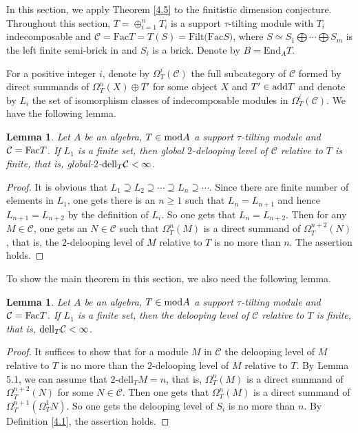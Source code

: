 \documentclass[a4paper]{amsart}
\newtheorem{lem}[thm]{Lemma}
\theoremstyle{definition}
\theoremstyle{remark}
\numberwithin{equation}{section}
\begin{document}
In this section, we apply Theorem \ref{4.5} to the finitistic dimension conjecture. Throughout this section, $T=\oplus_{i=1}^nT_i$ is a support $\tau$-tilting module with $T_i$ indecomposable and $\mathcal{C}=\text{Fac}T=T(S)=\text{Filt(Fac}S)$, where $S\simeq S_1\bigoplus \cdots \bigoplus S_m$ is the left finite semi-brick in \cite[Theorem 2.3(2)]{As}
 and $S_i$ is a brick. Denote by $B=\text{End}_A T$.

For a positive integer $i$, denote by $\Omega^i_T(\mathcal{C})$ the full subcategory of $\mathcal{C}$ formed by direct summands of $\Omega_T^n(X)\oplus T'$ for some object $X$ and $T'\in{\rm add}T$ and denote by $L_i$ the set of isomorphism classes of indecomposable modules in $\Omega^i_T(\mathcal{C})$. We have the following lemma.

\begin{lem}\label{5.1} Let $A$ be an algebra, $T\in {\rm mod}A$ a support $\tau$-tilting module and $\mathcal{C}=\textup{Fac}T$. If $L_1$ is a finite set, then global $2$-delooping level of $\mathcal{C}$ relative to $T$ is finite, that is, global-$2$-$\textup{dell}_T\mathcal{C}<\infty$.
\end{lem}

\begin{proof} It is obvious that $L_1\supseteq L_2\supseteq\cdots\supseteq L_n\supseteq\cdots$. Since there are finite number of elements in $L_1$, one gets there is an $n\geq 1$ such that $L_n=L_{n+1}$ and hence $L_{n+1}=L_{n+2}$ by the definition of $L_i$. So one gets that $L_n=L_{n+2}$. Then for any $M\in \mathcal{C}$, one gets an $N\in \mathcal{C}$ such that $\Omega^n_T(M)$ is a direct summand of $\Omega^{n+2}_T(N)$, that is, the $2$-delooping level of $M$ relative to $T$ is no more than $n$. The assertion holds.
\end{proof}

To show the main theorem in this section, we also need the following lemma.

\begin{lem}\label{5.2} Let $A$ be an algebra, $T\in {\rm mod}A$ a support $\tau$-tilting module and $\mathcal{C}=\textup{Fac}T$. If $L_1$ is a finite set, then the delooping level of $\mathcal{C}$ relative to $T$ is finite, that is, ${\rm dell}_T\mathcal{C}<\infty$.
\end{lem}

\begin{proof} It suffices to show that for a module $M$ in $\mathcal{C}$ the delooping level of $M$ relative to $T$ is no more than the $2$-delooping level of $M$ relative to $T$. By Lemma 5.1, we can assume that $2$-dell$_T M=n$, that is, $\Omega^n_T(M)$ is a direct summand of $\Omega^{n+2}_T(N)$ for some $N\in\mathcal{C}$. Then one gets that $\Omega^n_T(M)$ is a direct summand of $\Omega_T^{n+1}(\Omega^1_T N)$. So one gets the delooping level of $S_i$ is no more than $n$. By Definition \ref{4.1}, the assertion holds.
\end{proof}
\end{document}

